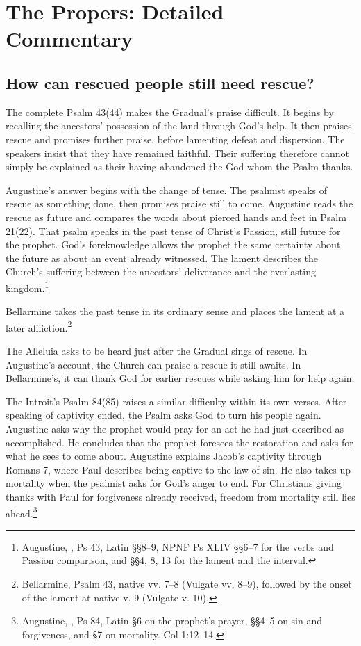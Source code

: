 \section{The Propers: Detailed Commentary}

\subsection{How can rescued people still need rescue?}

The complete Psalm 43(44) makes the Gradual's praise difficult. It begins by
recalling the ancestors' possession of the land through God's help. It then
praises rescue and promises further praise, before lamenting defeat and
dispersion. The speakers insist that they have remained faithful. Their
suffering therefore cannot simply be explained as their having abandoned
the God whom the Psalm thanks.

Augustine's answer begins with the change of tense. The psalmist speaks
of rescue as something done, then promises praise still to come.
Augustine reads the rescue as future and compares the words about pierced
hands and feet in Psalm 21(22). That psalm speaks in the past tense
of Christ's Passion, still future for the prophet. God's foreknowledge
allows the prophet the same certainty about the future as about an event
already witnessed. The lament describes the Church's suffering between the
ancestors' deliverance and the everlasting kingdom.\footnote{Augustine,
, Ps 43, Latin §§8--9, NPNF Ps XLIV §§6--7
for the verbs and Passion comparison, and §§4, 8, 13 for the lament and
the interval.}

Bellarmine takes the past tense in its ordinary sense and places the lament
at a later affliction.\footnote{Bellarmine,
Psalm 43, native vv. 7--8 (Vulgate vv. 8--9), followed by the onset of
the lament at native v. 9 (Vulgate v. 10).}

The Alleluia asks to be heard just after the Gradual sings of rescue.
In Augustine's account, the Church can praise a rescue it still awaits.
In Bellarmine's, it can thank God for earlier rescues while asking him
for help again.

The Introit's Psalm 84(85) raises a similar difficulty within its own
verses. After speaking of captivity ended, the Psalm asks God to turn
his people again. Augustine asks why the prophet would pray for an act
he had just described as accomplished. He concludes that the prophet
foresees the restoration and asks for what he sees to come about.
Augustine explains Jacob's captivity through Romans 7, where Paul
describes being captive to the law of sin. He also takes up mortality
when the psalmist asks for God's anger to end. For Christians giving
thanks with Paul for forgiveness already received, freedom from
mortality still lies ahead.\footnote{Augustine, , Ps 84, Latin §6 on the prophet's prayer, §§4--5 on sin and
forgiveness, and §7 on mortality. Col 1:12--14.}


